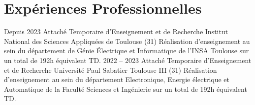\documentclass[11pt,a4paper,sans]{moderncv}         %
\begin{document}
\section{Exp\'eriences Professionnelles}
\cventry
{Depuis 2023}
{Attach\'e Temporaire d'Enseignement et de Recherche}
{Institut National des Sciences Appliqu\'ees de Toulouse (31)}
{}
{}
{
  R\'ealisation d'enseignement au sein du d\'epartement de G\'enie \'Electrique et Informatique de l'INSA Toulouse sur un total de 192h \'equivalent TD.
}
%
\cventry
{2022 -- 2023}
{Attach\'e Temporaire d'Enseignement et de Recherche}
{Universit\'e Paul Sabatier Toulouse III (31)}
{}
{}
{
  R\'ealisation d'enseignement au sein du d\'epartement Electronique, Energie \'electrique et Automatique de la Facult\'e Sciences et Ing\'enierie sur un total de 192h \'equivalent TD.
}
\end{document}

